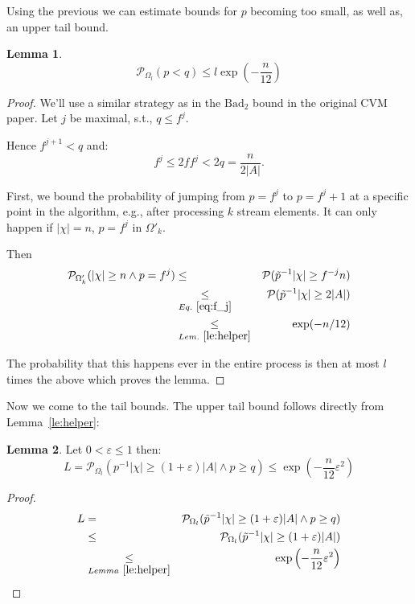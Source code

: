 \documentclass{article}
\newcommand{\prob}{\mathcal P}
\newcommand{\eps}{\varepsilon}
\theoremstyle{definition}
\newtheorem{lemma}{Lemma}
\begin{document}
Using the previous we can estimate bounds for $p$ becoming too small, as well as, an upper tail bound.
\begin{lemma}\label{le:low_p}
\[
\prob_{\Omega_l}(p < q) \leq l \exp\left( - \frac{n}{12}\right)
\]
\end{lemma}
\begin{proof}
We'll use a similar strategy as in the $\mathrm{Bad}_2$ bound in the original CVM paper. 
Let $j$ be maximal, s.t., $q \leq f^j$.

Hence $f^{j+1} < q$ and: 
\begin{equation}
\label{eq:f_j}
  f^j \leq 2f f^j < 2q = \frac{n}{2|A|} \textrm{.}
\end{equation}

First, we bound the probability of jumping from $p=f^j$ to $p=f^j+1$ at a specific point in the algorithm, e.g., after processing $k$ stream elements.
It can only happen if $|\chi|=n$, $p=f^j$ in $\Omega'_k$.

Then
\begin{eqnarray*}
  \prob_{\Omega'_k} ( |\chi| \geq n \wedge p=f^j) & \leq & \prob( \tilde{p}^{-1} |\chi| \geq f^{-j} n ) \\
    & \underset{Eq.~\ref{eq:f_j}}{\leq} & \prob( \tilde{p}^{-1} |\chi| \geq 2|A| ) \\
    & \underset{Lem.~\ref{le:helper}}{\leq} & \exp( - n/12)
\end{eqnarray*}

The probability that this happens ever in the entire process is then at most $l$ times the above which proves the lemma.
\end{proof}

Now we come to the tail bounds. The upper tail bound follows directly from Lemma~\ref{le:helper}:
\begin{lemma}\label{le:upper_tail}
Let $0 < \eps \leq 1$ then:
\[
  L = \prob_{\Omega_l} ( p^{-1} |\chi| \geq (1+\eps)|A| \wedge p \geq q) \leq \exp\left(-\frac{n}{12} \eps^2\right)
\]
\end{lemma}
\begin{proof}
\begin{eqnarray*}  
  L & =&  \prob_{\Omega_l} ( \tilde{p}^{-1} |\chi| \geq (1+\eps)|A| \wedge p \geq q) \\
  & \leq & \prob_{\Omega_l} ( \tilde{p}^{-1} |\chi| \geq (1+\eps)|A| ) \\
  & \underset{Lemma~\ref{le:helper}}{\leq}  &  \exp\left(-\frac{n}{12} \eps^2\right)
\end{eqnarray*}
\end{proof}
\end{document}
